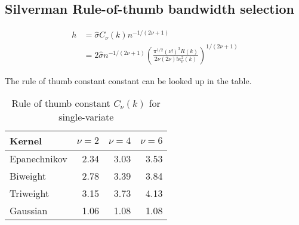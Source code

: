 \documentclass{article}
\def\tbf{\textbf}
\begin{document}
\subsection{Silverman Rule-of-thumb bandwidth selection}
\[ \begin{split}
h & =  \hat{\sigma} C_\nu(k) n^{-1/(2\nu+1)}  \\
 & = 2 \hat{\sigma} n^{-1/(2\nu+1)} \left( \frac{\pi^{1/2}(\nu!)^3 R(k)}{2\nu(2\nu)! \kappa_\nu^2(k)} \right)^{1/(2\nu+1)} \end{split}\]

The rule of thumb constant constant can be looked up in the table.
\begin{table}[!htbp]
  \begin{center}
    \caption{Rule of thumb constant $C_\nu(k)$ for single-variate}
  \begin{tabular}{lrrr}
    \hline \hline
    \tbf{Kernel} & $\nu = 2$ & $\nu = 4$ & $\nu = 6$ \\
    \hline
    Epanechnikov & 2.34 & 3.03 & 3.53 \\
    Biweight & 2.78 & 3.39 & 3.84 \\
    Triweight & 3.15 & 3.73 & 4.13 \\
    Gaussian & 1.06 & 1.08 & 1.08 \\ \hline
  \end{tabular}
  \end{center}
\end{table}



\end{document}
